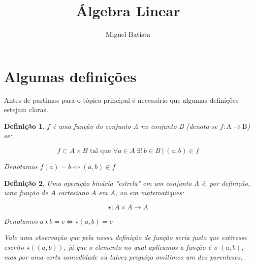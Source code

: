 \documentclass{article}
\title{Álgebra Linear}
\author{Miguel Batista}
\date{}
\newtheorem{definition}{Definição}[section]
\begin{document}
\maketitle

\section{Algumas definições}

Antes de partimos para o tópico principal é necessário que algumas definições estejam claras.

\begin{definition}


$f$ é uma função do conjunto A no conjunto B (denota-se $f: \text{A} \to \text{B}$) se:

\[f \subset A \times B \text{ tal que } \forall a \in A \ \exists ! \ b \in B \ | \ (a,b) \in f \]

Denotamos $f(a) = b \iff (a,b) \in f$
\end{definition}


\begin{definition}




Uma operação binária \emph{"estrela"} em um conjunto A é, por definição, uma função de $A$ cartesiano $A$ em $A$, ou em matematiques:

\[ \star : A \times A \to A \]

Denotamos $a \star b = c \iff \star(a,b) = c$

Vale uma observação que pela nossa definição de função seria justo que estivesse escrito $\star((a,b))$, já que o elemento no qual aplicamos a função é o $(a,b)$, mas por uma certa comodidade ou talvez preguiça omitimos um dos parenteses. 

\end{definition}
\end{document}
